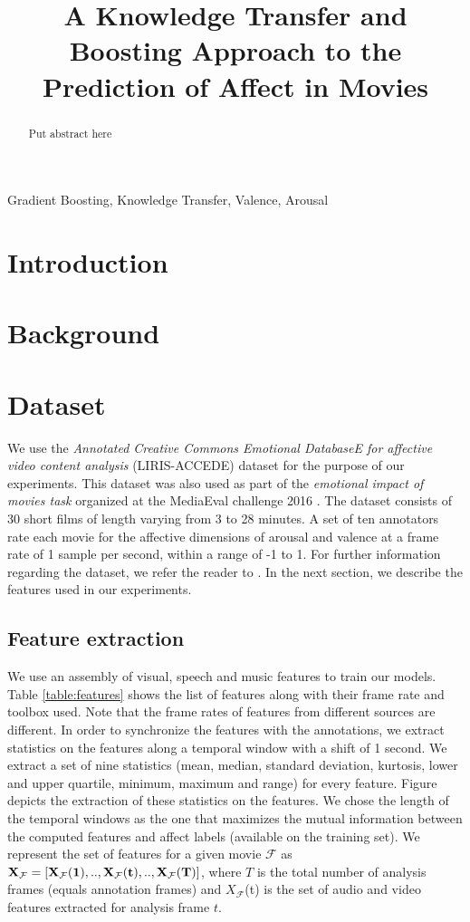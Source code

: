 \documentclass{article}
\title{A Knowledge Transfer and Boosting Approach to the Prediction of Affect in Movies}
\begin{document}
\ninept
%
\maketitle
%
\begin{abstract}
   Put abstract here 
 
\end{abstract}
%
\begin{keywords}
Gradient Boosting, Knowledge Transfer, Valence, Arousal
\end{keywords}
%
\section{Introduction}
\label{sec:intro}

\section{Background}


\section{Dataset}

We use the {\it Annotated Creative Commons Emotional DatabaseE for affective video content analysis} (LIRIS-ACCEDE) dataset for the purpose of our experiments.
This dataset was also used as part of the {\it emotional impact of movies task} organized at the MediaEval challenge 2016 \cite{}.
The dataset consists of 30 short films of length varying from 3 to 28 minutes.
A set of ten annotators rate each movie for the affective dimensions of arousal and valence at a frame rate of 1 sample per second, within a range of -1 to 1. 
For further information regarding the dataset, we refer the reader to \cite{}.
In the next section, we describe the features used in our experiments.

\subsection{Feature extraction} \label{feature_extraction}
We use an assembly of visual, speech and music features to train our models.
Table \ref{table:features} shows the list of features along with their frame rate and toolbox used. 
Note that the frame rates of features from different sources are different.
In order to synchronize the features with the annotations, we extract statistics on the features along a temporal window with a shift of 1 second. 
We extract a set of nine statistics (mean, median, standard deviation, kurtosis, lower and upper quartile, minimum, maximum and range) for every feature. 
Figure \cite{} depicts the extraction of these statistics on the features.
We chose the length of the temporal windows as the one that maximizes the mutual information between the computed features and affect labels (available on the training set).
We represent the set of features for a given movie $\mathcal{F}$ as $\bf X_{\mathcal{F}} = [X_{\mathcal{F}}(1), .., X_{\mathcal{F}}(t), .., X_{\mathcal{F}}(T) ]$, where $T$ is the total number of analysis frames (equals annotation frames) and $X_{\mathcal{F}}$(t) is the set of audio and video features extracted for analysis frame $t$. 
\end{document}
